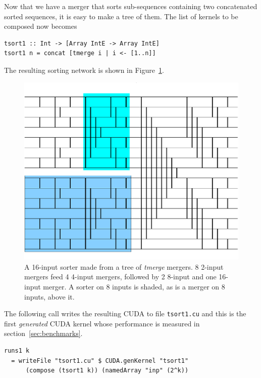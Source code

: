 \documentclass[]{sigplanconf}
\begin{document}
Now that we have a merger that sorts sub-sequences containing two concatenated sorted sequences, it
is easy to make a tree of them.
The list of kernels to be composed now becomes
\begin{codesize}
\begin{verbatim}
tsort1 :: Int -> [Array IntE -> Array IntE]
tsort1 n = concat [tmerge i | i <- [1..n]]
\end{verbatim}
\end{codesize}
\noindent
The resulting sorting network is shown in Figure~\ref{fig:mixedsorter}.


\begin{figure}
\centering
\includegraphics[scale=0.33]{mmixedsorter}
\caption{A 16-input sorter made from a tree of {\em tmerge} mergers. 8 2-input mergers
feed 4 4-input mergers, followed  by 2 8-input and one 16-input merger.
A sorter on 8 inputs is shaded, as is a merger on 8 inputs, above it. 
}
\label{fig:mixedsorter}
\end{figure}
\noindent
The following call writes the resulting CUDA to file {\tt tsort1.cu}
and this is the first {\em generated} CUDA kernel whose performance is measured in section~\ref{sec:benchmarks}.

\begin{codesize}
\begin{verbatim}
runs1 k
  = writeFile "tsort1.cu" $ CUDA.genKernel "tsort1" 
      (compose (tsort1 k)) (namedArray "inp" (2^k))
\end{verbatim}
\end{codesize}
\end{document}
